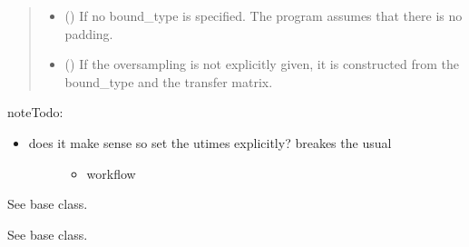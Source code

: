\documentclass[letterpaper,10pt,english]{sphinxmanual}
\begin{document}
\begin{fulllineitems}
\begin{quote}
\begin{description}
\begin{itemize}
\item {} 
 () \textendash{} If no bound\_type is specified. The program assumes that there is no
padding.

\item {} 
 () \textendash{} If the oversampling is not explicitly given, it is constructed from
the bound\_type and the transfer matrix.

\end{itemize}

\end{description}\end{quote}

\begin{sphinxadmonition}{note}{\label{\detokenize{qsim:id46}}Todo:}\begin{itemize}
\item {} \begin{description}
\item[{does it make sense so set the utimes explicitly? breakes the usual}] \leavevmode\begin{itemize}
\item {} 
workflow

\end{itemize}

\end{description}

\end{itemize}
\end{sphinxadmonition}

\begin{fulllineitems}
\label{\detokenize{qsim:qsim.transfer_function.CustomTF.set_times}}
See base class.

\end{fulllineitems}


\begin{fulllineitems}
\label{\detokenize{qsim:qsim.transfer_function.CustomTF.transfer_matrix}}
See base class.

\end{fulllineitems}


\end{fulllineitems}
\end{document}
